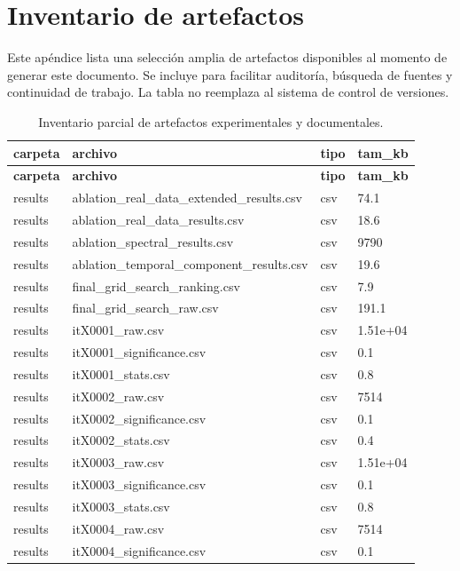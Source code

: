 \chapter{Inventario de artefactos}
\label{app:inventario}
Este apéndice lista una selección amplia de artefactos disponibles al momento de generar este documento. Se incluye para facilitar auditoría, búsqueda de fuentes y continuidad de trabajo. La tabla no reemplaza al sistema de control de versiones.
\begin{landscape}
\scriptsize
\begin{longtable}{p{}p{}p{}p{}}
\caption{Inventario parcial de artefactos experimentales y documentales.}\label{tab:app_artifact_inventory}\\
\toprule
\textbf{carpeta} & \textbf{archivo} & \textbf{tipo} & \textbf{tam\_kb} \\
\midrule
\endfirsthead
\toprule
\textbf{carpeta} & \textbf{archivo} & \textbf{tipo} & \textbf{tam\_kb} \\
\midrule
\endhead
results & ablation\_real\_data\_extended\_results.csv & csv & 74.1 \\
results & ablation\_real\_data\_results.csv & csv & 18.6 \\
results & ablation\_spectral\_results.csv & csv & 9790 \\
results & ablation\_temporal\_component\_results.csv & csv & 19.6 \\
results & final\_grid\_search\_ranking.csv & csv & 7.9 \\
results & final\_grid\_search\_raw.csv & csv & 191.1 \\
results & itX0001\_raw.csv & csv & 1.51e+04 \\
results & itX0001\_significance.csv & csv & 0.1 \\
results & itX0001\_stats.csv & csv & 0.8 \\
results & itX0002\_raw.csv & csv & 7514 \\
results & itX0002\_significance.csv & csv & 0.1 \\
results & itX0002\_stats.csv & csv & 0.4 \\
results & itX0003\_raw.csv & csv & 1.51e+04 \\
results & itX0003\_significance.csv & csv & 0.1 \\
results & itX0003\_stats.csv & csv & 0.8 \\
results & itX0004\_raw.csv & csv & 7514 \\
results & itX0004\_significance.csv & csv & 0.1 \\

\end{longtable}
\end{landscape}
